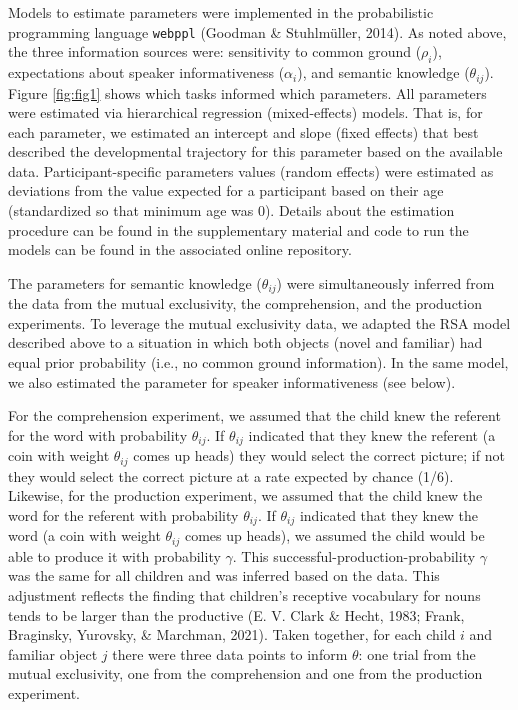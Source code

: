 \documentclass[
  man,floatsintext]{apa6}
\begin{document}
Models to estimate parameters were implemented in the probabilistic programming language \texttt{webppl} (Goodman \& Stuhlmüller, 2014). As noted above, the three information sources were: sensitivity to common ground (\(\rho_i\)), expectations about speaker informativeness (\(\alpha_i\)), and semantic knowledge (\(\theta_{ij}\)). Figure \ref{fig:fig1} shows which tasks informed which parameters. All parameters were estimated via hierarchical regression (mixed-effects) models. That is, for each parameter, we estimated an intercept and slope (fixed effects) that best described the developmental trajectory for this parameter based on the available data. Participant-specific parameters values (random effects) were estimated as deviations from the value expected for a participant based on their age (standardized so that minimum age was 0). Details about the estimation procedure can be found in the supplementary material and code to run the models can be found in the associated online repository.

The parameters for semantic knowledge (\(\theta_{ij}\)) were simultaneously inferred from the data from the mutual exclusivity, the comprehension, and the production experiments. To leverage the mutual exclusivity data, we adapted the RSA model described above to a situation in which both objects (novel and familiar) had equal prior probability (i.e., no common ground information). In the same model, we also estimated the parameter for speaker informativeness (see below).

For the comprehension experiment, we assumed that the child knew the referent for the word with probability \(\theta_{ij}\). If \(\theta_{ij}\) indicated that they knew the referent (a coin with weight \(\theta_{ij}\) comes up heads) they would select the correct picture; if not they would select the correct picture at a rate expected by chance (1/6). Likewise, for the production experiment, we assumed that the child knew the word for the referent with probability \(\theta_{ij}\). If \(\theta_{ij}\) indicated that they knew the word (a coin with weight \(\theta_{ij}\) comes up heads), we assumed the child would be able to produce it with probability \(\gamma\). This successful-production-probability \(\gamma\) was the same for all children and was inferred based on the data. This adjustment reflects the finding that children's receptive vocabulary for nouns tends to be larger than the productive (E. V. Clark \& Hecht, 1983; Frank, Braginsky, Yurovsky, \& Marchman, 2021). Taken together, for each child \(i\) and familiar object \(j\) there were three data points to inform \(\theta\): one trial from the mutual exclusivity, one from the comprehension and one from the production experiment.
\end{document}
